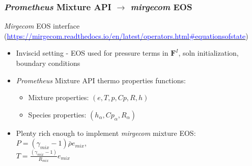 \begin{frame}\frametitle{\textit{Prometheus} Mixture API $\rightarrow$ \textit{mirgecom} EOS}
\begin{center}
  \textit{Mirgecom} EOS interface (\href{https://mirgecom.readthedocs.io/en/latest/operators.html\#equations-of-state}{\textcolor{blue}{https://mirgecom.readthedocs.io/en/latest/operators.html\#equations\-of\-state}})
\end{center}
\begin{multicols}{2}
\begin{itemize}
  \item Inviscid setting - EOS used for pressure terms in $\mathbf{F}^I$, soln initialization, boundary conditions
  \item \textit{Prometheus} Mixture API thermo properties functions:
  \begin{itemize}
    \item Mixture properties: $(e, T, p, Cp, R, h)$
    \item Species properties: $(h_\alpha, Cp_\alpha, R_\alpha)$
  \end{itemize}
  \item Plenty rich enough to implement \textit{mirgecom} mixture EOS:\\$P = (\gamma_{mix} - 1)\bar\rho{e}_{mix}$,\\ $T = \frac{(\gamma_{mix} - 1)}{R_{mix}} e_{mix}$

\end{itemize}
\end{multicols}
\end{frame}
